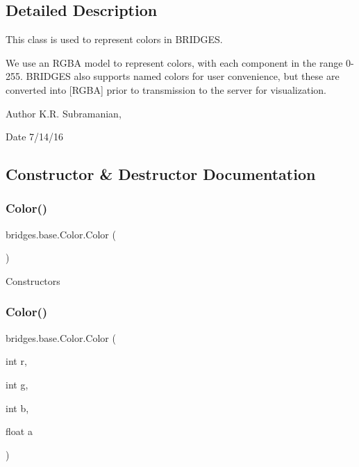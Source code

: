 \subsection{Detailed Description}
This class is used to represent colors in B\+R\+I\+D\+G\+ES. 

We use an R\+G\+BA model to represent colors, with each component in the range 0-\/255. B\+R\+I\+D\+G\+ES also supports named colors for user convenience, but these are converted into \mbox{[}R\+G\+BA\mbox{]} prior to transmission to the server for visualization.

\begin{DoxyAuthor}{Author}
K.\+R. Subramanian, 
\end{DoxyAuthor}
\begin{DoxyDate}{Date}
7/14/16 
\end{DoxyDate}


\subsection{Constructor \& Destructor Documentation}
\hypertarget{classbridges_1_1base_1_1_color_ab6d71ac2ee1430fb2db2fbe34e692de8}{}\label{classbridges_1_1base_1_1_color_ab6d71ac2ee1430fb2db2fbe34e692de8} 
\subsubsection{\texorpdfstring{Color()}{Color()}\hspace{0.1cm}{\footnotesize\ttfamily [1/3]}}
{\footnotesize\ttfamily bridges.\+base.\+Color.\+Color (\begin{DoxyParamCaption}{ }\end{DoxyParamCaption})}

Constructors \hypertarget{classbridges_1_1base_1_1_color_a15f56590ca3c9cc161c7bfa47060ad21}{}\label{classbridges_1_1base_1_1_color_a15f56590ca3c9cc161c7bfa47060ad21} 
\subsubsection{\texorpdfstring{Color()}{Color()}\hspace{0.1cm}{\footnotesize\ttfamily [2/3]}}
{\footnotesize\ttfamily bridges.\+base.\+Color.\+Color (\begin{DoxyParamCaption}\item[{int}]{r,  }\item[{int}]{g,  }\item[{int}]{b,  }\item[{float}]{a }\end{DoxyParamCaption})}

